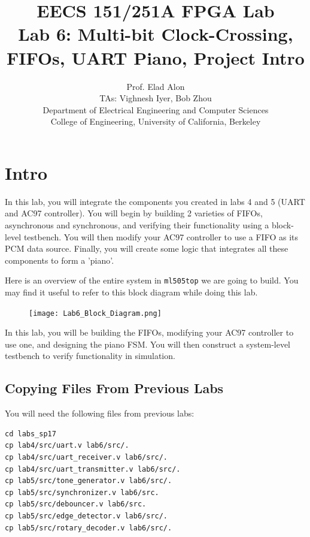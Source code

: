 \documentclass[11pt]{article}
\begin{document}
\title{EECS 151/251A FPGA Lab\\
Lab 6: Multi-bit Clock-Crossing, FIFOs, UART Piano, Project Intro}

\author{Prof. Elad Alon \\
TAs: Vighnesh Iyer, Bob Zhou \\Department of Electrical Engineering and Computer Sciences\\
College of Engineering, University of California, Berkeley}
\date{}
\maketitle

\tableofcontents

\section{Intro}
In this lab, you will integrate the components you created in labs 4 and 5 (UART and AC97 controller). You will begin by building 2 varieties of FIFOs, asynchronous and synchronous, and verifying their functionality using a block-level testbench. You will then modify your AC97 controller to use a FIFO as its PCM data source. Finally, you will create some logic that integrates all these components to form a 'piano'.

Here is an overview of the entire system in \verb|ml505top| we are going to build. You may find it useful to refer to this block diagram while doing this lab.

\begin{figure}[H]
	\centerline{\texttt{[image: Lab6\_Block\_Diagram.png]}}
\end{figure}

In this lab, you will be building the FIFOs, modifying your AC97 controller to use one, and designing the piano FSM. You will then construct a system-level testbench to verify functionality in simulation.

\subsection{Copying Files From Previous Labs}
You will need the following files from previous labs:

\begin{verbatim}
cd labs_sp17
cp lab4/src/uart.v lab6/src/.
cp lab4/src/uart_receiver.v lab6/src/.
cp lab4/src/uart_transmitter.v lab6/src/.
cp lab5/src/tone_generator.v lab6/src/.
cp lab5/src/synchronizer.v lab6/src.
cp lab5/src/debouncer.v lab6/src.
cp lab5/src/edge_detector.v lab6/src/.
cp lab5/src/rotary_decoder.v lab6/src/.
\end{verbatim}
\end{document}
